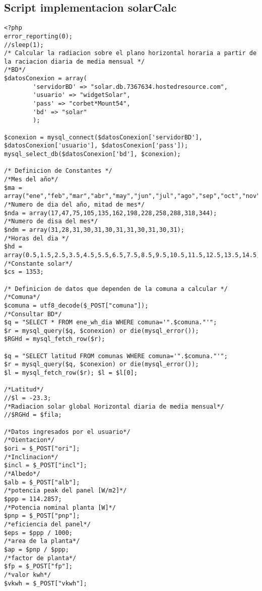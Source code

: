 \subsection{Script implementacion solarCalc}
\label{phpCalculadora}
\begin{verbatim}
<?php
error_reporting(0);
//sleep(1);
/* Calcular la radiacion sobre el plano horizontal horaria a partir de la raciacion diaria de media mensual */
/*BD*/
$datosConexion = array(
        'servidorBD' => "solar.db.7367634.hostedresource.com",
        'usuario' => "widgetSolar",
        'pass' => "corbet*Mount54",
        'bd' => "solar"
        );

$conexion = mysql_connect($datosConexion['servidorBD'], $datosConexion['usuario'], $datosConexion['pass']);
mysql_select_db($datosConexion['bd'], $conexion);

/* Definicion de Constantes */
/*Mes del año*/
$ma = array("ene","feb","mar","abr","may","jun","jul","ago","sep","oct","nov","dic");
/*Numero de dia del año, mitad de mes*/
$nda = array(17,47,75,105,135,162,198,228,258,288,318,344);
/*Numero de disa del mes*/
$ndm = array(31,28,31,30,31,30,31,31,30,31,30,31);
/*Horas del dia */
$hd = array(0.5,1.5,2.5,3.5,4.5,5.5,6.5,7.5,8.5,9.5,10.5,11.5,12.5,13.5,14.5,15.5,16.5,17.5,18.5,19.5,20.5,21.5,22.5,23.5);
/*Constante solar*/
$cs = 1353;

/* Definicion de datos que dependen de la comuna a calcular */
/*Comuna*/
$comuna = utf8_decode($_POST["comuna"]);
/*Consultar BD*/
$q = "SELECT * FROM ene_wh_dia WHERE comuna='".$comuna."'";
$r = mysql_query($q, $conexion) or die(mysql_error());
$RGHd = mysql_fetch_row($r);

$q = "SELECT latitud FROM comunas WHERE comuna='".$comuna."'";
$r = mysql_query($q, $conexion) or die(mysql_error());
$l = mysql_fetch_row($r); $l = $l[0];
 
/*Latitud*/
//$l = -23.3;
/*Radiacion solar global Horizontal diaria de media mensual*/
//$RGHd = $fila;

/*Datos ingresados por el usuario*/
/*Oientacion*/
$ori = $_POST["ori"];
/*Inclinacion*/
$incl = $_POST["incl"];
/*Albedo*/
$alb = $_POST["alb"];
/*potencia peak del panel [W/m2]*/
$ppp = 114.2857;
/*Potencia nominal planta [W]*/
$pnp = $_POST["pnp"];
/*eficiencia del panel*/
$eps = $ppp / 1000;
/*area de la planta*/
$ap = $pnp / $ppp;
/*factor de planta*/
$fp = $_POST["fp"];
/*valor kwh*/
$vkwh = $_POST["vkwh"];


\end{verbatim}
